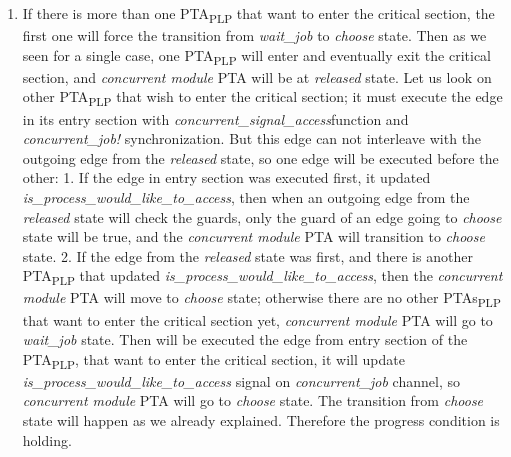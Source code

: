 \begin{enumerate}
\begin{enumerate}
\item If there is more than one PTA\textsubscript{PLP} that want to enter the critical section, the first one will force the transition from \textcolor{ColorUppaalState}{\textit{wait_job}} to \textcolor{ColorUppaalState}{\textit{choose}} state. Then as we seen for a single case, one PTA\textsubscript{PLP} will enter and eventually exit the critical section, and \textit{concurrent module} PTA will be at \textcolor{ColorUppaalState}{\textit{released}} state. Let us look on other PTA\textsubscript{PLP} that wish to enter the critical section; it must execute the edge in its entry section with \textcolor{ColorUppaalFunction}{\textit{concurrent_signal_access}}​ function and \textcolor{ColorUppaalChannel}{\textit{concurrent_job!}} synchronization. But this edge can not interleave with the outgoing edge from the \textcolor{ColorUppaalState}{\textit{released}} state, so one edge will be executed before the other: 1. If the edge in entry section was executed first, it updated \textcolor{ColorEdgeGuard}{\textit{is_process_would_like_to_access}}, then when an outgoing edge from the \textcolor{ColorUppaalState}{\textit{released}} state will check the guards, only the guard of an edge going to \textcolor{ColorUppaalState}{\textit{choose}} state will be true, and the \textit{concurrent module} PTA will transition to \textcolor{ColorUppaalState}{\textit{choose}} state. 2. If the edge from the \textcolor{ColorUppaalState}{\textit{released}} state was first, and there is another PTA\textsubscript{PLP} that updated \textcolor{ColorEdgeGuard}{\textit{is_process_would_like_to_access}}, then the \textit{concurrent module} PTA will move to \textcolor{ColorUppaalState}{\textit{choose}} state; otherwise there are no other PTAs\textsubscript{PLP} that want to enter the critical section yet, \textit{concurrent module} PTA will go to \textcolor{ColorUppaalState}{\textit{wait_job}} state. Then will be executed the edge from entry section of the PTA\textsubscript{PLP}, that want to enter the critical section, it will update \textcolor{ColorEdgeGuard}{\textit{is_process_would_like_to_access}} signal on \textcolor{ColorUppaalChannel}{\textit{concurrent_job}} channel, so \textit{concurrent module} PTA will go to \textcolor{ColorUppaalState}{\textit{choose}} state. The transition from \textcolor{ColorUppaalState}{\textit{choose}} state will happen as we already explained. Therefore the progress condition is holding.
\end{enumerate} 

\end{enumerate}
